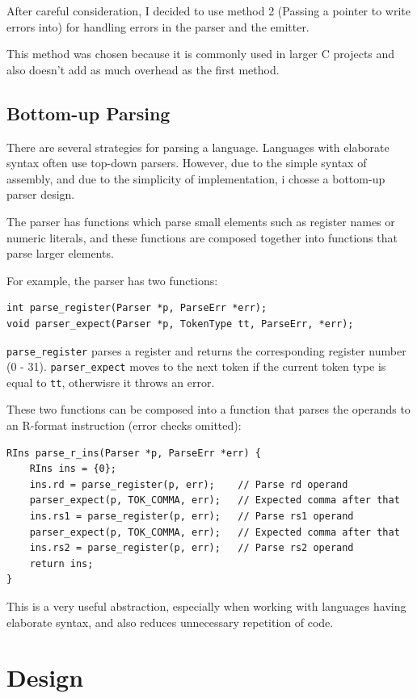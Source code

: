 \documentclass{article}
\begin{document}
After careful consideration, I decided to use method 2 (Passing
a pointer to write errors into) for handling errors in the
parser and the emitter.

This method was chosen because it is commonly used in larger C projects
and also doesn't add as much overhead as the first method.

\subsection{Bottom-up Parsing}

There are several strategies for parsing a language. Languages with
elaborate syntax often use top-down parsers. However, due to the simple
syntax of assembly, and due to the simplicity of implementation, i
chosse a bottom-up parser design.

The parser has functions which parse small elements such as register
names or numeric literals, and these functions are composed together
into functions that parse larger elements.

For example, the parser has two functions:
\begin{verbatim}
int parse_register(Parser *p, ParseErr *err);
void parser_expect(Parser *p, TokenType tt, ParseErr, *err);
\end{verbatim}

\texttt{parse\_register} parses a register and returns the
corresponding register number (0 - 31). \texttt{parser\_expect}
moves to the next token if the current token type is equal to
\texttt{tt}, otherwisre it throws an error.

These two functions can be composed into a function that parses the operands
to an R-format instruction (error checks omitted):

\begin{verbatim}
RIns parse_r_ins(Parser *p, ParseErr *err) {
    RIns ins = {0};
    ins.rd = parse_register(p, err);    // Parse rd operand
    parser_expect(p, TOK_COMMA, err);   // Expected comma after that
    ins.rs1 = parse_register(p, err);   // Parse rs1 operand 
    parser_expect(p, TOK_COMMA, err);   // Expected comma after that
    ins.rs2 = parse_register(p, err);   // Parse rs2 operand
    return ins;
}
\end{verbatim}

This is a very useful abstraction, especially when working with languages
having elaborate syntax, and also reduces unnecessary repetition of code.

\section{Design}
\end{document}
